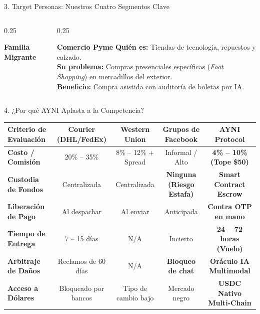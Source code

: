 \documentclass[10pt,aspectratio=169]{beamer}
\begin{document}
\begin{frame}{3. Target Personas: Nuestros Cuatro Segmentos Clave}
\begin{columns}[T]
\begin{column}{0.25\textwidth}
\begin{block}{\centering \textbf{Familia Migrante}}
      \end{block}
    \end{column}
    \begin{column}{0.25\textwidth}
      \begin{block}{\centering \textbf{Comercio Pyme}}
        \scriptsize
        \textbf{Quién es:} Tiendas de tecnología, repuestos y calzado.\\
        \vspace{0.1cm}
        \textbf{Su problema:} Compras presenciales específicas (\textit{Foot Shopping}) en mercadillos del exterior.\\
        \vspace{0.1cm}
        \textbf{Beneficio:} Compra asistida con auditoría de boletas por IA.
      \end{block}
    \end{column}
  \end{columns}
\end{frame}

\begin{frame}{4. ¿Por qué AYNI Aplasta a la Competencia?}
  \begin{center}
    \small
    \begin{tabular}{lcccc}
      \toprule
      \textbf{Criterio de Evaluación} & \textbf{Courier (DHL/FedEx)} & \textbf{Western Union} & \textbf{Grupos de Facebook} & \textbf{AYNI Protocol} \\
      \midrule
      \textbf{Costo / Comisión} & 20\% -- 35\% & 8\% -- 12\% + Spread & Informal / Alto & \textcolor{AyniGreen}{\textbf{4\% -- 10\% (Tope \$50)}} \\
      \textbf{Custodia de Fondos} & Centralizada & Centralizada & \textcolor{AyniRed}{\textbf{Ninguna (Riesgo Estafa)}} & \textcolor{AyniGreen}{\textbf{Smart Contract Escrow}} \\
      \textbf{Liberación de Pago} & Al despachar & Al enviar & Anticipada & \textcolor{AyniGreen}{\textbf{Contra OTP en mano}} \\
      \textbf{Tiempo de Entrega} & 7 -- 15 días & N/A & Incierto & \textcolor{AyniGreen}{\textbf{24 -- 72 horas (Vuelo)}} \\
      \textbf{Arbitraje de Daños} & Reclamos de 60 días & N/A & \textcolor{AyniRed}{\textbf{Bloqueo de chat}} & \textcolor{AyniGreen}{\textbf{Oráculo IA Multimodal}} \\
      \textbf{Acceso a Dólares} & Bloqueado por bancos & Tipo de cambio bajo & Mercado negro & \textcolor{AyniGreen}{\textbf{USDC Nativo Multi-Chain}} \\
      \bottomrule
    \end{tabular}
  \end{center}
\end{frame}
\end{document}
